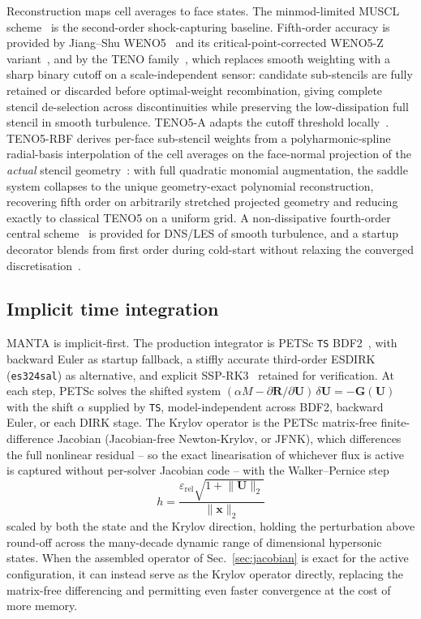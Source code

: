\documentclass[journal,biblatex]{new-aiaa}
\newcommand{\U}{\mathbf{U}}
\begin{document}
Reconstruction maps cell averages to face states. The minmod-limited MUSCL scheme~\cite{van_leer_towards_1979} is the second-order shock-capturing baseline. Fifth-order accuracy is provided by Jiang--Shu WENO5~\cite{jiang_efficient_1996,shu_efficient_1988} and its critical-point-corrected WENO5-Z variant~\cite{borges_improved_2008}, and by the TENO family~\cite{fu_family_2016,fu_review_2023}, which replaces smooth weighting with a sharp binary cutoff on a scale-independent sensor: candidate sub-stencils are fully retained or discarded before optimal-weight recombination, giving complete stencil de-selection across discontinuities while preserving the low-dissipation full stencil in smooth turbulence. TENO5-A adapts the cutoff threshold locally~\cite{fu_very-high-order_2019}. TENO5-RBF derives per-face sub-stencil weights from a polyharmonic-spline radial-basis interpolation of the cell averages on the face-normal projection of the \emph{actual} stencil geometry~\cite{coveler_enhancing_2025}: with full quadratic monomial augmentation, the saddle system collapses to the unique geometry-exact polynomial reconstruction, recovering fifth order on arbitrarily stretched projected geometry and reducing exactly to classical TENO5 on a uniform grid. A non-dissipative fourth-order central scheme~\cite{leveque_finite_2002} is provided for DNS/LES of smooth turbulence, and a startup decorator blends from first order during cold-start without relaxing the converged discretisation~\cite{richtmyer_proposed_1948}.

\subsection{Implicit time integration}
\label{sec:temporal}

MANTA is implicit-first. The production integrator is PETSc \texttt{TS} BDF2~\cite{hairer_solving_1996}, with backward Euler as startup fallback, a stiffly accurate third-order ESDIRK (\texttt{es324sal}) as alternative, and explicit SSP-RK3~\cite{gottlieb_strong_2001} retained for verification. At each step, PETSc solves the shifted system $(\alpha M - \partial\mathbf{R}/\partial\U)\,\delta\U = -\mathbf{G}(\U)$ with the shift $\alpha$ supplied by \texttt{TS}, model-independent across BDF2, backward Euler, or each DIRK stage. The Krylov operator is the PETSc matrix-free finite-difference Jacobian (Jacobian-free Newton-Krylov, or JFNK), which differences the full nonlinear residual -- so the exact linearisation of whichever flux is active is captured without per-solver Jacobian code -- with the Walker--Pernice step~\cite{pernice_nitsol_1998,dennis_numerical_1996}
\begin{equation}
h=\frac{\varepsilon_{\mathrm{rel}}\sqrt{1+\lVert\U\rVert_2}}{\lVert\mathbf{x}\rVert_2}
\end{equation}
scaled by both the state and the Krylov direction, holding the perturbation above round-off across the many-decade dynamic range of dimensional hypersonic states. When the assembled operator of Sec.~\ref{sec:jacobian} is exact for the active configuration, it can instead serve as the Krylov operator directly, replacing the matrix-free differencing and permitting even faster convergence at the cost of more memory.
\end{document}
